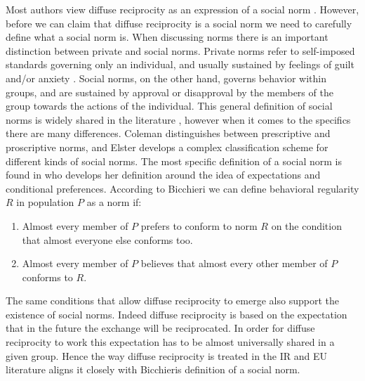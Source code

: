 Most authors view diffuse reciprocity as an expression of a social norm \citep{Keohane1986,Lewis2000,Lewis2005,Diekmann2004}. However, before we can claim that diffuse reciprocity is a social norm we need to carefully define what a social norm is. When discussing norms there is an important distinction between private and social norms. Private norms refer to self-imposed standards governing only an individual, and usually sustained by feelings of guilt and/or anxiety \citep[100]{Elster1989}. Social norms, on the other hand, governs behavior within groups, and are sustained by approval or disapproval by the members of the group towards the actions of the individual. This general definition of social norms is widely shared in the literature \citep{Elster1989,Bicchieri1990,Coleman1990}, however when it comes to the specifics there are many differences. Coleman distinguishes between prescriptive and proscriptive norms, and Elster develops a complex classification scheme for different kinds of social norms. The most specific definition of a social norm is found in \citet{Bicchieri2006} who develops her definition around the idea of expectations and conditional preferences. According to Bicchieri we can define behavioral regularity $R$ in population $P$ as a norm if:

\begin{enumerate}
\item Almost every member of $P$ prefers to conform to norm $R$ on the condition that almost everyone else conforms too.
\item Almost every member of $P$ believes that almost every other member of $P$ conforms to $R$.
\end{enumerate} 

The same conditions that allow diffuse reciprocity to emerge also support the existence of social norms. Indeed diffuse reciprocity is based on the expectation that in the future the exchange will be reciprocated. In order for diffuse reciprocity to work this expectation has to be almost universally shared in a given group. Hence the way diffuse reciprocity is treated in the IR and EU literature aligns it closely with Bicchieris definition of a social norm. 

